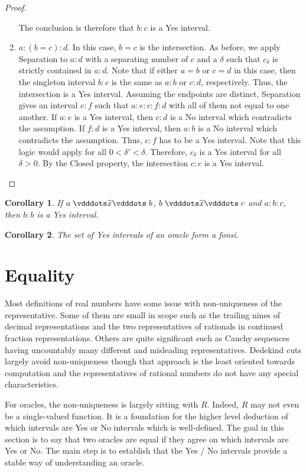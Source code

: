\documentclass[12pt]{article}
\newtheorem{corollary}{Corollary}[section]
\begin{document}
\begin{proof}
\begin{enumerate}
        The conclusion is therefore that $b:c$ is a Yes interval. 

        \item $a:(b=c):d$. In this case, $b=c$ is the intersection. As before, we apply Separation to $a:d$ with a separating number of $c$ and a $\delta$ such that $c_\delta$ is strictly contained in $a:d$. Note that if either $a=b$ or $c=d$ in this case, then the singleton interval $b:c$ is the same as $a:b$ or $c:d$, respectively. Thus, the intersection is a Yes interval. Assuming the endpoints are distinct, Separation gives an interval $e:f$ such that $a:e:c:f:d$ with all of them not equal to one another. If $a:e$ is a Yes interval, then $c:d$ is a No interval which contradicts the assumption. If $f:d$ is a Yes interval, then $a:b$ is a No interval which contradicts the assumption. Thus, $e:f$ has to be a Yes interval. Note that this logic would apply for all $0 < \delta' < \delta$. Therefore, $c_\delta$ is a Yes interval for all $\delta > 0$. By the Closed property, the intersection $c:c$ is a Yes interval. 
     \end{enumerate}
\end{proof}

\begin{corollary}
    If $a \xora b$, $b \xora c$ and $a:b:c$, then $b:b$ is a Yes interval.
\end{corollary}



\begin{corollary}
    The set of Yes intervals of an oracle form a fonsi. 
\end{corollary}

\section{Equality}

Most definitions of real numbers have some issue with non-uniqueness of the representative. Some of them are small in scope such as the trailing nines of decimal representations and the two representatives of rationals in continued fraction representations. Others are quite significant such as Cauchy sequences having uncountably many different and misleading representatives. Dedekind cuts largely avoid non-uniqueness though that approach is the least oriented towards computation and the representatives of rational numbers do not have any special characteristics. 

For oracles, the non-uniqueness is largely sitting with $R$. Indeed, $R$ may not even be a single-valued function. It is a foundation for the higher level deduction of which intervals are Yes or No intervals which is well-defined. The goal in this section is to say that two oracles are equal if they agree on which intervals are Yes or No. The main step is to establish that the Yes / No intervals provide a stable way of understanding an oracle. 
\end{document}
